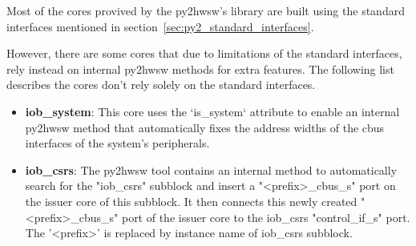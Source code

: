 %

Most of the cores provived by the py2hwsw's library are built using the standard interfaces mentioned in section~\ref{sec:py2_standard_interfaces}.

However, there are some cores that due to limitations of the standard interfaces, rely instead on internal py2hwsw methods for extra features.
The following list describes the cores don't rely solely on the standard interfaces.

\begin{itemize}
\item \textbf{iob\_system}: This core uses the `is\_system` attribute to enable an internal py2hwsw method that automatically fixes the address widths of the cbus interfaces of the system's peripherals.
\item \textbf{iob\_csrs}: The py2hwsw tool contains an internal method to automatically search for the "iob\_csrs" subblock and insert a "\textless prefix\textgreater \_cbus\_s" port on the issuer core of this subblock. It then connects this newly created "\textless prefix\textgreater \_cbus\_s" port of the issuer core to the iob\_csrs "control\_if\_s" port. The '\textless prefix\textgreater ' is replaced by instance name of iob\_csrs subblock.
\end{itemize}


